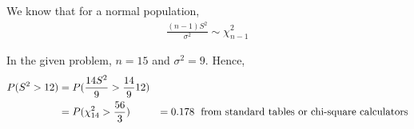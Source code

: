\documentclass[../../probability-notes.tex]{subfile}
\begin{document}
    We know that for a normal population,
    \begin{align*}
        \frac{(n-1)S^{2}}{\sigma^{2}} \sim \chi_{n-1}^{2}
    \end{align*}
    
    In the given problem, $n = 15$ and $\sigma^{2} = 9$. Hence,
    \begin{align*}
        P(S^{2} > 12) &= P(\frac{14 S^{2}}{9} > \frac{14}{9} 12)\\
        &= P(\chi_{14}^{2} > \frac{56}{3})
        &= 0.178 \text{\; from standard tables or chi-square calculators}
    \end{align*}
\end{document}

